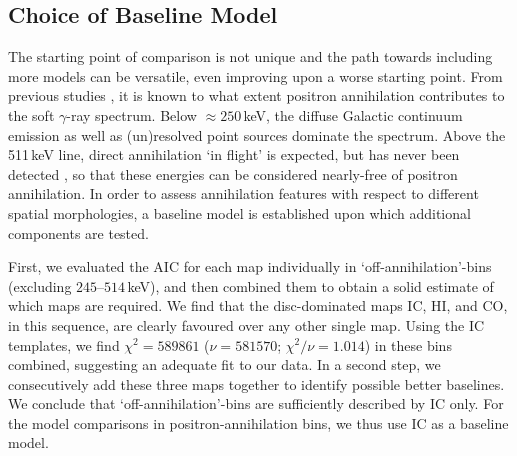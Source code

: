 \documentclass[doublespace,nopageskip]{VTthesis} %
\begin{document}
	
	\subsection{Choice of Baseline Model}\label{sec:baseline_model}
	The starting point of comparison is not unique and the path towards including more models can be versatile, even improving upon a worse starting point.
	From previous studies \citep[e.g.,][]{Strong2005_gammaconti,Bouchet2011_diffuseCR,Churazov2011_511}, it is known to what extent positron annihilation contributes to the soft $\gamma$-ray spectrum.
	Below $\approx 250$\,keV, the diffuse Galactic continuum emission as well as (un)resolved point sources dominate the spectrum.
	Above the 511\,keV line, direct annihilation `in flight' is expected, but has never been detected \citep[e.g.,][]{Beacom2006_511,Sizun2006_511,Churazov2011_511}, so that these energies can be considered nearly-free of positron annihilation.
	In order to assess annihilation features with respect to different spatial morphologies, a baseline model is established upon which additional components are tested. 
	
	
	First, we evaluated the AIC for each map individually in `off-annihilation'-bins (excluding $245$--$514$\,keV), and then combined them to obtain a solid estimate of which maps are required.
	We find that the disc-dominated maps IC, HI, and CO, in this sequence, are clearly favoured over any other single map.
	Using the IC templates, we find  $\chi^2 = 589861$ ($\nu = 581570$; $\chi^2/\nu = 1.014$) in these bins combined, suggesting an adequate fit to our data.
	In a second step, we consecutively add these three maps together to identify possible better baselines.
	We conclude that `off-annihilation'-bins are sufficiently described by IC only.
	For the model comparisons in positron-annihilation bins, we thus use IC as a baseline model.
	
\end{document}
